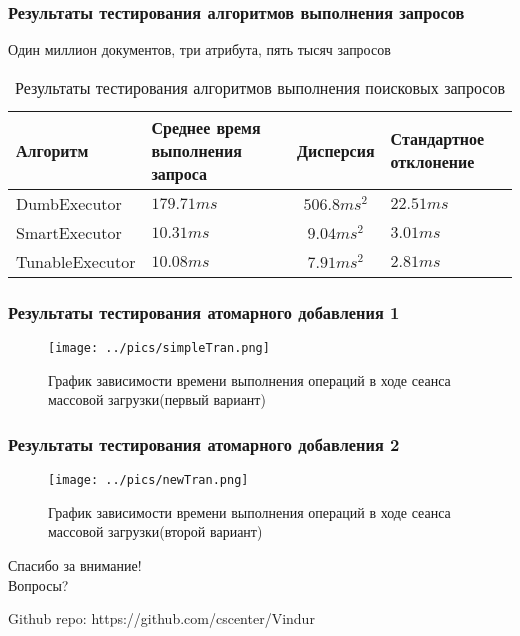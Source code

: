 \documentclass{beamer}
\begin{document}
\begin{frame}\frametitle{Результаты тестирования алгоритмов выполнения запросов}
    Один миллион документов, три атрибута, пять тысяч запросов
    \begin{table}[H]
            \caption{Результаты тестирования алгоритмов выполнения поисковых запросов}
            \centering
                \begin{tabularx}{\textwidth}{| l | X | c | X |}
                    \hline
                    Алгоритм  & Среднее время выполнения запроса  & Дисперсия & Стандартное отклонение  \\
                    \hline
                    DumbExecutor & $179.71 ms$ & $506.8 ms^2$ & $22.51 ms$  \\
                    \hline
                    SmartExecutor & $10.31  ms$ & $9.04 ms^2$ & $3.01 ms$  \\
                    \hline
                    TunableExecutor & $10.08 ms$ & $7.91 ms^2$ & $2.81 ms$  \\
                    \hline                    
                \end{tabularx}  
        \end{table}
\end{frame}

\begin{frame}\frametitle{Результаты тестирования атомарного добавления 1}
    \begin{figure}[H]
        \centering
        \texttt{[image: ../pics/simpleTran.png]}
        \caption{График зависимости времени выполнения операций в ходе сеанса массовой загрузки(первый вариант)}
        \label{simpleTran}
    \end{figure}
\end{frame}

\begin{frame}\frametitle{Результаты тестирования атомарного добавления 2}
    \begin{figure}[H]
        \centering
        \texttt{[image: ../pics/newTran.png]}
        \caption{График зависимости времени выполнения операций в ходе сеанса массовой загрузки(второй вариант)}
        \label{newTran}
    \end{figure}
\end{frame}

\begin{frame} 
    \begin{center} 
        \Huge Спасибо за внимание! \\ Вопросы? 
    \end{center} 
    \begin{block}{Github repo:}
        https://github.com/cscenter/Vindur
    \end{block}
\end{frame} 
\end{document}
